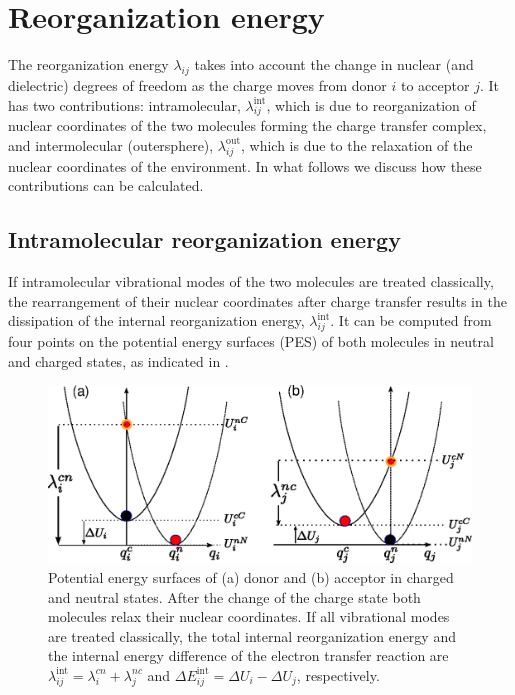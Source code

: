 \section{Reorganization energy}
\label{sec:reorganization}

The reorganization energy $\lambda_{ij}$ takes into account the change in  nuclear (and dielectric) degrees of freedom as the charge moves from donor $i$ to acceptor $j$. It has two contributions: intramolecular, $\lambda^\text{int}_{ij}$, which is due to reorganization of nuclear coordinates of the two molecules forming the charge transfer complex, and intermolecular (outersphere), $\lambda^\text{out}_{ij}$, which is due to the relaxation of the nuclear coordinates of the environment. In what follows we discuss how these contributions can be calculated.

\subsection{Intramolecular reorganization energy}
\label{sec:inner_reorganization}
If intramolecular vibrational modes of the two molecules are treated classically, the rearrangement of their nuclear coordinates after charge transfer results in the dissipation of the internal reorganization energy, $\lambda_{ij}^\text{int}$. It can be computed from four points on the potential energy surfaces (PES) of both molecules in neutral and charged states, as indicated in . 

\begin{figure}
   \centering
   \includegraphics[width=0.6\linewidth]{fig/reorganization_energy/monomer_parabolas}
    \caption{Potential energy surfaces of (a) donor and (b) acceptor in charged and neutral states. After the change of the charge state both molecules relax their nuclear coordinates. If all vibrational modes are treated classically, the total internal reorganization energy and the internal energy difference of the electron transfer reaction are $\lambda_{ij}^\text{int} = \lambda_{i}^{cn} + \lambda_{j}^{nc}$ and $\Delta E_{ij}^\text{int} =  \Delta U_i - \Delta U_j$, respectively.}
   \label{fig:parabolas}
\end{figure}



